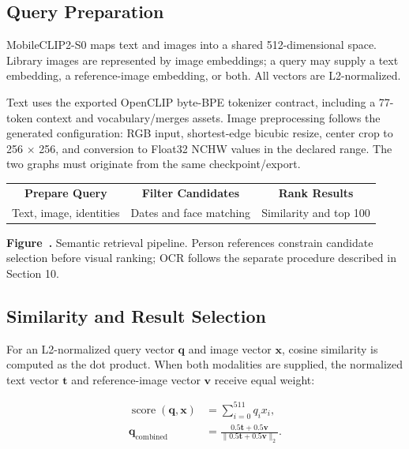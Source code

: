 \documentclass[11pt,a4paper]{article}
\newcommand{\reportfigurecaption}[2]{\par\refstepcounter{figure}\label{fig:#1}{\small\textbf{Figure~\thefigure.} #2}\par}
\begin{document}
\subsection{Query Preparation}

MobileCLIP2-S0 maps text and images into a shared 512-dimensional space. Library images are represented by image embeddings; a query may supply a text embedding, a reference-image embedding, or both. All vectors are L2-normalized.

Text uses the exported OpenCLIP byte-BPE tokenizer contract, including a 77-token context and vocabulary/merges assets. Image preprocessing follows the generated configuration: RGB input, shortest-edge bicubic resize, center crop to 256 \(\times\) 256, and conversion to Float32 NCHW values in the declared range. The two graphs must originate from the same checkpoint/export.


\begin{center}
\begin{tabular}{c@{\quad$\rightarrow$\quad}c@{\quad$\rightarrow$\quad}c}
\textbf{Prepare Query} & \textbf{Filter Candidates} & \textbf{Rank Results} \\[3pt]
Text, image, identities & Dates and face matching & Similarity and top 100
\end{tabular}
\end{center}


\reportfigurecaption{retrieval}{Semantic retrieval pipeline. Person references constrain candidate selection before visual ranking; OCR follows the separate procedure described in Section 10.}

\subsection{Similarity and Result Selection}

For an L2-normalized query vector \(\mathbf q\) and image vector \(\mathbf x\), cosine similarity is computed as the dot product. When both modalities are supplied, the normalized text vector \(\mathbf t\) and reference-image vector \(\mathbf v\) receive equal weight:

\begin{align}
\operatorname{score}(\mathbf q,\mathbf x)&=\sum_{i=0}^{511}q_i x_i,\label{eq:similarity}\\
\mathbf q_{\text{combined}}&=\frac{0.5\mathbf t+0.5\mathbf v}{\lVert0.5\mathbf t+0.5\mathbf v\rVert_2}.\label{eq:combined}
\end{align}
\end{document}
